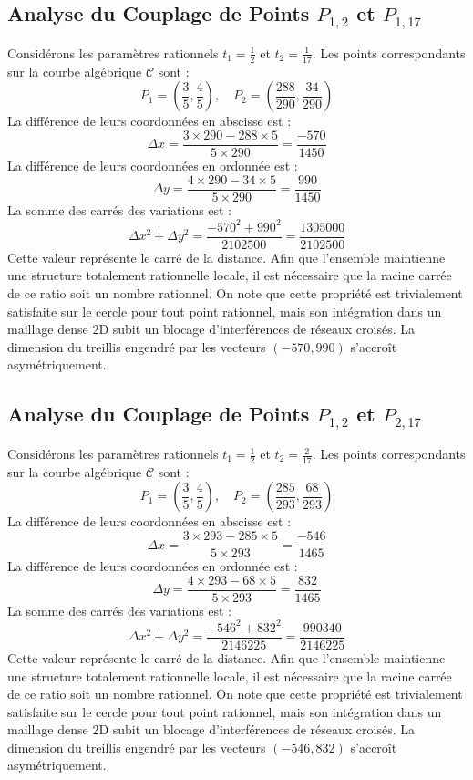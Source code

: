 \documentclass[12pt, a4paper]{article}
\begin{document}
\subsection{Analyse du Couplage de Points $P_{1,2}$ et $P_{1,17}$}
Considérons les paramètres rationnels $t_1 = \frac{1}{2}$ et $t_2 = \frac{1}{17}$.
Les points correspondants sur la courbe algébrique $\mathcal{C}$ sont :
$$ P_1 = \left( \frac{3}{5}, \frac{4}{5} \right), \quad P_2 = \left( \frac{288}{290}, \frac{34}{290} \right) $$
La différence de leurs coordonnées en abscisse est :
$$ \Delta x = \frac{3 \times 290 - 288 \times 5}{5 \times 290} = \frac{-570}{1450} $$
La différence de leurs coordonnées en ordonnée est :
$$ \Delta y = \frac{4 \times 290 - 34 \times 5}{5 \times 290} = \frac{990}{1450} $$
La somme des carrés des variations est :
$$ \Delta x^2 + \Delta y^2 = \frac{ -570^2 + 990^2 }{ 2102500 } = \frac{ 1305000 }{ 2102500 } $$
Cette valeur représente le carré de la distance. Afin que l'ensemble maintienne une structure totalement rationnelle locale, il est nécessaire que la racine carrée de ce ratio soit un nombre rationnel. On note que cette propriété est trivialement satisfaite sur le cercle pour tout point rationnel, mais son intégration dans un maillage dense 2D subit un blocage d'interférences de réseaux croisés. La dimension du treillis engendré par les vecteurs $( -570, 990 )$ s'accroît asymétriquement.


\subsection{Analyse du Couplage de Points $P_{1,2}$ et $P_{2,17}$}
Considérons les paramètres rationnels $t_1 = \frac{1}{2}$ et $t_2 = \frac{2}{17}$.
Les points correspondants sur la courbe algébrique $\mathcal{C}$ sont :
$$ P_1 = \left( \frac{3}{5}, \frac{4}{5} \right), \quad P_2 = \left( \frac{285}{293}, \frac{68}{293} \right) $$
La différence de leurs coordonnées en abscisse est :
$$ \Delta x = \frac{3 \times 293 - 285 \times 5}{5 \times 293} = \frac{-546}{1465} $$
La différence de leurs coordonnées en ordonnée est :
$$ \Delta y = \frac{4 \times 293 - 68 \times 5}{5 \times 293} = \frac{832}{1465} $$
La somme des carrés des variations est :
$$ \Delta x^2 + \Delta y^2 = \frac{ -546^2 + 832^2 }{ 2146225 } = \frac{ 990340 }{ 2146225 } $$
Cette valeur représente le carré de la distance. Afin que l'ensemble maintienne une structure totalement rationnelle locale, il est nécessaire que la racine carrée de ce ratio soit un nombre rationnel. On note que cette propriété est trivialement satisfaite sur le cercle pour tout point rationnel, mais son intégration dans un maillage dense 2D subit un blocage d'interférences de réseaux croisés. La dimension du treillis engendré par les vecteurs $( -546, 832 )$ s'accroît asymétriquement.
\end{document}
